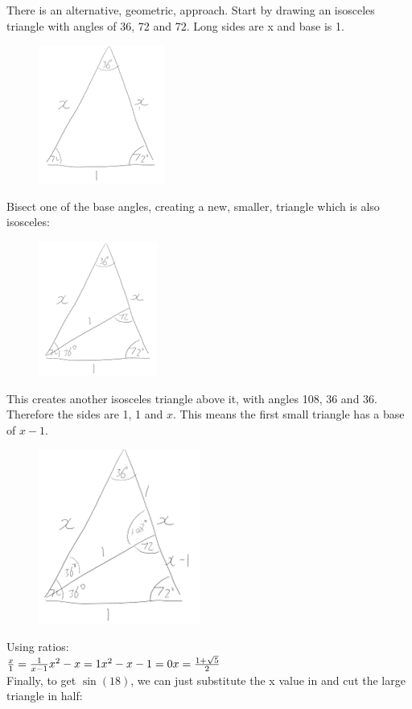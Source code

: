 \documentclass[../main.tex]{subfiles}
\begin{document}
\begin{enumerate}
    There is an alternative, geometric, approach. Start by drawing an isosceles triangle with angles of 36, 72 and 72. Long sides are x and base is 1.
    \begin{figure}[H]
        \centering
        \includegraphics[width=0.2\linewidth]{images/t1w8q2_a1.png}
    \end{figure}
    Bisect one of the base angles, creating a new, smaller, triangle which is also isosceles:
    \begin{figure}[H]
        \centering
        \includegraphics[width=0.25\linewidth]{images/t1w8q2_a2.png}
    \end{figure}
    This creates another isosceles triangle above it, with angles 108, 36 and 36. Therefore the sides are 1, 1 and \(x\). This means the first small triangle has a base of \(x-1\).
    \begin{figure}[H]
        \centering
        \includegraphics[width=0.25\linewidth]{images/t1w8q2_a3.png}
    \end{figure}
    Using ratios:\\
    \(\frac{x}{1}=\frac{1}{x-1}\\
    x^2-x=1\\
    x^2-x-1=0\\
    x=\frac{1+\sqrt{5}}{2}\)\\
    Finally, to get \(\sin(18)\), we can just substitute the x value in and cut the large triangle in half:
    \begin{figure}[H]

\end{figure}
\end{enumerate}
\end{document}
